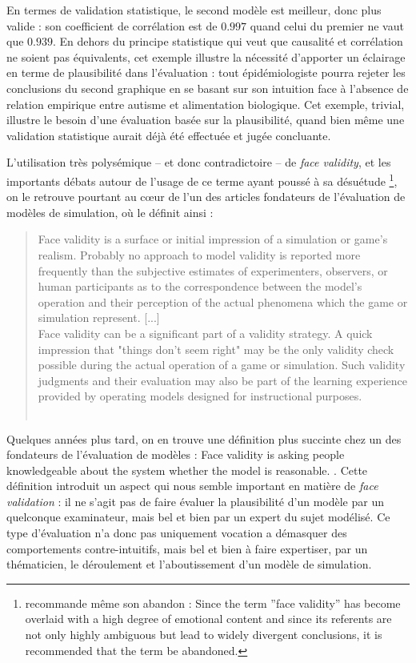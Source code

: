 En termes de validation statistique, le second modèle est meilleur, donc plus valide : son coefficient de corrélation est de $0.997$ quand celui du premier ne vaut que $0.939$.
En dehors du principe statistique qui veut que causalité et corrélation ne soient pas équivalents, cet exemple illustre la nécessité d'apporter un éclairage en terme de plausibilité dans l'évaluation :
	tout épidémiologiste pourra rejeter les conclusions du second graphique en se basant sur son intuition face à l'absence de relation empirique entre autisme et alimentation biologique.
Cet exemple, trivial, illustre le besoin d'une évaluation basée sur la plausibilité, quand bien même une validation statistique aurait déjà été effectuée et jugée concluante.


L'utilisation très polysémique -- et donc contradictoire -- de \og \textit{face validity}\fg{}, et les importants débats autour de l'usage de ce terme ayant poussé à sa désuétude
\footnote{
	\cite[205]{mosier_critical_1947} recommande même son abandon : \og Since the term ''face validity'' has become overlaid with a high degree of emotional content and since its referents are not only highly ambiguous but lead to widely divergent conclusions, it is recommended that the term be abandoned.\fg{}
}, on le retrouve pourtant au cœur de l'un des articles fondateurs de l'évaluation de modèles de simulation, où \citeauthor{hermann_validation_1967} le définit ainsi :

\begin{quotation}
	\noindent \og Face validity is a surface or initial impression of a simulation or game's realism.
	Probably no approach to model validity is reported more frequently than the subjective estimates of experimenters, observers, or human participants as to the correspondence between the model's operation and their perception of the actual phenomena which the game or simulation represent.
	[...]\\
	Face validity can be a significant part of a validity strategy. A quick impression that "things don't seem right" may be the only validity check possible during the actual operation of a game or simulation. Such validity judgments and their evaluation may also be part of the learning experience provided by operating models designed for instructional purposes.\fg{}\\
	\mbox{}~ \hfill \textcite[221]{hermann_validation_1967}
\end{quotation}

Quelques années plus tard, on en trouve une définition plus succinte chez un des fondateurs de l'évaluation de modèles : \og Face validity is asking people knowledgeable about the system whether the model is reasonable.\fg{} \autocite[500]{sargent_validation_1979}.
Cette définition introduit un aspect qui nous semble important en matière de \textit{face validation} : il ne s'agit pas de faire évaluer la plausibilité d'un modèle par un quelconque examinateur, mais bel et bien par un expert du sujet modélisé.
Ce type d'évaluation n'a donc pas uniquement vocation a démasquer des comportements contre-intuitifs, mais bel et bien à faire expertiser, par un thématicien, le déroulement et l'aboutissement d'un modèle de simulation.

